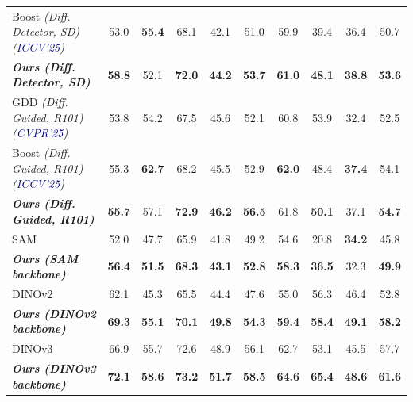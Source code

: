 \begin{table}[ht]
{\begin{tabular}{l|cccccccc>{\columncolor{gray!20}}c}
   
    Boost\footnotesize{ \textit{(Diff. Detector, SD)}}~\cite{he2025boosting}  \textit{\scriptsize{(\textcolor{darkblue}{ICCV'25})}}& 53.0 & \textbf{55.4} & 68.1 & 42.1 & 51.0 & 59.9 & 39.4 & 36.4 & 50.7 \\
    \rowcolor{lightgreen}
    \textbf{\textit{Ours\footnotesize{ (Diff. Detector, SD)}}} & \textbf{58.8} & 52.1 & \textbf{72.0} & \textbf{44.2} & \textbf{53.7} & \textbf{61.0} & \textbf{48.1} &\textbf{38.8} & \textbf{53.6} \\
    \midrule
     GDD \footnotesize{\textit{(Diff. Guided, R101)}}\normalsize~\cite{he2025generalized}  \textit{\scriptsize{(\textcolor{darkblue}{CVPR'25})}} & 53.8 & 54.2 & 67.5 & 45.6 & 52.1 & 60.8 & 53.9 & 32.4 & 52.5 \\
    Boost\footnotesize{ \textit{(Diff. Guided, R101)}}~\cite{he2025boosting}  \textit{\scriptsize{(\textcolor{darkblue}{ICCV'25})}}& 55.3 & \textbf{62.7} & 68.2 & 45.5 & 52.9 & \textbf{62.0} & 48.4 & \textbf{37.4} & 54.1 \\
    \rowcolor{lightgreen}
    \textbf{\textit{Ours\footnotesize{ (Diff. Guided, R101)}}} & \textbf{55.7} & 57.1 & \textbf{72.9} & \textbf{46.2} & \textbf{56.5} & 61.8 & \textbf{50.1} & 37.1 & \textbf{54.7} \\
    \midrule
     SAM & 52.0 & 47.7 & 65.9 & 41.8 & 49.2 & 54.6 & 20.8 & \textbf{34.2} & 45.8 \\
    \rowcolor{lightgreen}
    \textit{\textbf{Ours \footnotesize{(SAM backbone)}}} & \textbf{56.4} & \textbf{51.5} & \textbf{68.3} & \textbf{43.1} & \textbf{52.8} & \textbf{58.3} & \textbf{36.5} & 32.3 & \textbf{49.9} \\
        \midrule
    DINOv2 & 62.1 & 45.3 & 65.5 & 44.4 & 47.6 & 55.0 & 56.3 & 46.4 & 52.8 \\
    \rowcolor{lightgreen}
    \textit{\textbf{Ours \footnotesize{(DINOv2 backbone)}}} & \textbf{69.3} & \textbf{55.1} & \textbf{70.1} & \textbf{49.8} & \textbf{54.3} & \textbf{59.4} & \textbf{58.4} & \textbf{49.1} & \textbf{58.2} \\
    \midrule
    DINOv3 & 66.9 & 55.7 & 72.6 & 48.9 & 56.1 & 62.7 & 53.1 & 45.5 & 57.7 \\
    \rowcolor{lightgreen}
    \textit{\textbf{Ours \footnotesize{(DINOv3 backbone)}}} & \textbf{72.1} & \textbf{58.6} & \textbf{73.2} & \textbf{51.7} & \textbf{58.5} & \textbf{64.6} & \textbf{65.4} & \textbf{48.6} & \textbf{61.6} \\

   
    \bottomrule
    \end{tabular}%
    }
    \vspace{-6pt}
\end{table}
